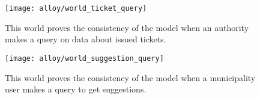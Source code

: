 \documentclass[./main.tex]{subfiles}
\begin{document}
\newpage



\begin{figure}[H]
\centering
\texttt{[image: alloy/world\_ticket\_query]}
\caption{This world proves the consistency of the model when an authority
makes a query on data about issued tickets.}
\end{figure}

\newpage



\begin{figure}[H]
\centering
\texttt{[image: alloy/world\_suggestion\_query]}
\caption{This world proves the consistency of the model when a
municipality user makes a query to get suggestions.}
\end{figure}
\end{document}
